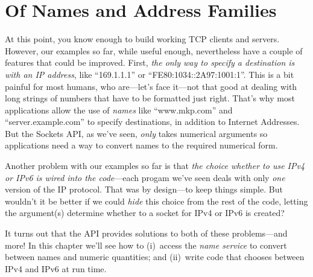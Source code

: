	
\chapter{Of Names and Address Families}
\label{chap:addrindep}

At this point, you know enough to build working TCP clients and servers.
However, our examples so far, while useful enough, nevertheless have a
couple of 
features that could be improved.  First, \emph{the only way to specify a
destination is with an IP address},
like ``169.1.1.1'' or ``FE80:1034::2A97:1001:1''.
This is a bit painful for most humans, who are---let's face it---not
that good at dealing with long strings of numbers that have to be
formatted just right.
That's why most applications allow the use of \emph{names\/}
like ``www.mkp.com'' and ``server.example.com'' to specify
destinations, in addition to Internet Addresses.
%
But the Sockets API, as we've seen, \emph{only\/} takes numerical
arguments so applications need a way to convert names to
the required numerical form.

Another problem with our examples so far is that \emph{the choice whether
to use IPv4 or IPv6 is wired into the code}---each progam we've seen
deals with only \emph{one\/} version of the IP protocol.  That was
by design---to keep things simple.  But wouldn't it be better
if we could \emph{hide\/} this choice from the rest of the
code, letting the argument(s) determine whether to a socket for IPv4
or IPv6 is created?

It turns out that the API provides solutions to
both of these problems---and more!
In this chapter we'll see how to
(i)~access the \emph{name service\/} to convert between names and
numeric quantities; and (ii)~write code that
chooses between IPv4 and IPv6 at run time.
%


